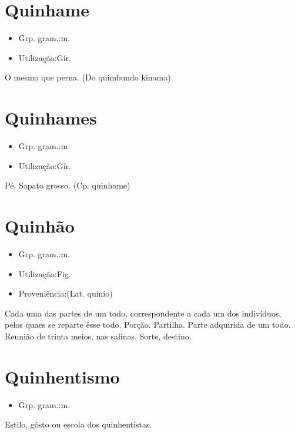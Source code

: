 \section{Quinhame}
\begin{itemize}
\item {Grp. gram.:m.}
\end{itemize}
\begin{itemize}
\item {Utilização:Gír.}
\end{itemize}
O mesmo que \textunderscore perna\textunderscore .
(Do quimbundo \textunderscore kinama\textunderscore )
\section{Quinhames}
\begin{itemize}
\item {Grp. gram.:m.}
\end{itemize}
\begin{itemize}
\item {Utilização:Gír.}
\end{itemize}
Pé.
Sapato grosso.
(Cp. \textunderscore quinhame\textunderscore )
\section{Quinhão}
\begin{itemize}
\item {Grp. gram.:m.}
\end{itemize}
\begin{itemize}
\item {Utilização:Fig.}
\end{itemize}
\begin{itemize}
\item {Proveniência:(Lat. \textunderscore quinio\textunderscore )}
\end{itemize}
Cada uma das partes de um todo, correspondente a cada um dos indivíduos, pelos quaes se reparte êsse todo.
Porção.
Partilha.
Parte adquirida de um todo.
Reunião de trinta \textunderscore meios\textunderscore , nas salinas.
Sorte, destino.
\section{Quinhentismo}
\begin{itemize}
\item {Grp. gram.:m.}
\end{itemize}
Estilo, gôsto ou escola dos quinhentistas.
